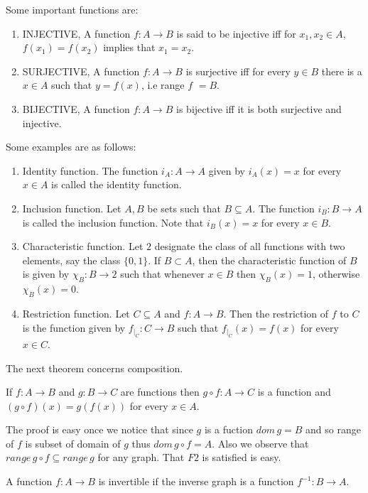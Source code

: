 Some important functions are:
\begin{enumerate}
    \item INJECTIVE, A function $f : A \to B$ is said to be injective iff for $x_1,x_2 \in A$,
	$f(x_1) = f(x_2)$ implies that $x_1 = x_2$.
    \item SURJECTIVE, A function $f : A \to B$ is surjective iff for every $y \in B$ there is a $x
	\in A$ such that $y = f(x)$, i.e range $f$ $ = B$.
    \item BIJECTIVE, A function $f : A \to B$ is bijective iff it is both surjective and injective.
\end{enumerate}

Some examples are as follows:
\begin{enumerate}
    \item Identity function. The function $i_A : A \to A$ given by $i_A(x) = x$ 
	for every $ x\in A$ is called the identity function.  
    \item Inclusion function. Let $A,B$ be sets such that $B \subseteq A$. The function $i_B : B \to
	A$ is called the inclusion function. Note that $i_B(x) = x$ for every $x \in B$.
    \item Characteristic function. Let $2$ designate the class of all functions with two elements, say the
	class $\lbrace 0,1\rbrace$. If $B \subset A$, then the characteristic function of $B$ is
	given by $\chi_B : B \to 2$ such that whenever $x \in B$ then $\chi_B(x) = 1$, otherwise
	$\chi_B(x) = 0$. 
    \item Restriction function. Let $C \subseteq A$ and $f : A \to B$. Then the restriction of $f$
	to $C$ is the function given by $f_{|_C} : C \to B$ such that $f_{|_C}(x) = f(x)$ for every
	$x \in C$.
\end{enumerate}

The next theorem concerns composition.
\begin{Theorem}
    If $f : A \to B$ and $g : B \to C$ are functions then $g \circ f : A \to C $ is a function and
    $(g\circ f)(x) = g(f(x))$ for every $x \in A$.
\end{Theorem}
The proof is easy once we notice that since $g$ is a fuction $dom\,g = B$ and so range of $f$ is
subset of domain of $g$ thus $dom\,g\circ f = A$. Also we observe that $range\, g\circ f \subseteq
range\,g$ for any graph. That $F2$ is satisfied is easy.

\begin{Definition}
    A function $f : A \to B$ is invertible if the inverse graph is a function $f^{-1} : B \to A$.
\end{Definition}

